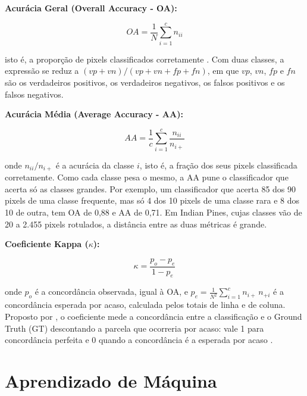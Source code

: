 \textbf{Acurácia Geral (Overall Accuracy - OA):}

\begin{equation}
OA = \frac{1}{N} \sum_{i=1}^{c} n_{ii}
\end{equation}

\noindent isto é, a proporção de pixels classificados corretamente \cite{Congalton1991}. Com duas classes, a expressão se reduz a $(vp + vn)/(vp + vn + fp + fn)$, em que $vp$, $vn$, $fp$ e $fn$ são os verdadeiros positivos, os verdadeiros negativos, os falsos positivos e os falsos negativos.

\textbf{Acurácia Média (Average Accuracy - AA):}

\begin{equation}
AA = \frac{1}{c} \sum_{i=1}^{c} \frac{n_{ii}}{n_{i+}}
\end{equation}

\noindent onde $n_{ii}/n_{i+}$ é a acurácia da classe $i$, isto é, a fração dos seus pixels classificada corretamente. Como cada classe pesa o mesmo, a AA pune o classificador que acerta só as classes grandes. Por exemplo, um classificador que acerta 85 dos 90 pixels de uma classe frequente, mas só 4 dos 10 pixels de uma classe rara e 8 dos 10 de outra, tem OA de 0,88 e AA de 0,71. Em Indian Pines, cujas classes vão de 20 a 2.455 pixels rotulados, a distância entre as duas métricas é grande.

\textbf{Coeficiente Kappa ($\kappa$):}

\begin{equation}
\kappa = \frac{p_o - p_e}{1 - p_e}
\end{equation}

\noindent onde $p_o$ é a concordância observada, igual à OA, e $p_e = \frac{1}{N^2} \sum_{i=1}^{c} n_{i+}\, n_{+i}$ é a concordância esperada por acaso, calculada pelos totais de linha e de coluna. Proposto por , o coeficiente mede a concordância entre a classificação e o Ground Truth (GT) descontando a parcela que ocorreria por acaso: vale 1 para concordância perfeita e 0 quando a concordância é a esperada por acaso \cite{Congalton1991}.

\section{Aprendizado de Máquina}


